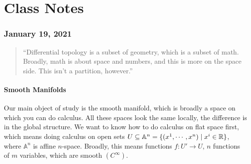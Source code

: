 \newpage
\part{Class Notes}
\section{January 19, 2021}
\begin{quote}
    ``Differential topology is a subset of geometry, which is a subset of math. Broadly, math is about space and numbers, and this is more on the space side. This isn't a partition, however.''
\end{quote}

\subsection{Smooth Manifolds}
Our main object of study is the smooth manifold, which is broadly a space on which you can do calculus. All these spaces look the same locally, the difference is in the global structure. We want to know how to do calculus on flat space first, which means doing calculus on open sets $U \subseteq \mathbb A^n  = \{(x^1,\cdots ,x^n )  \mid x^i  \in \mathbb{R}\} $, where $\mathbb A^n $ is affine $n$-space. Broadly, this means functions $f \colon U' \to U$, $n$ functions of $m$ variables, which are smooth $(C^{\infty})$. 


